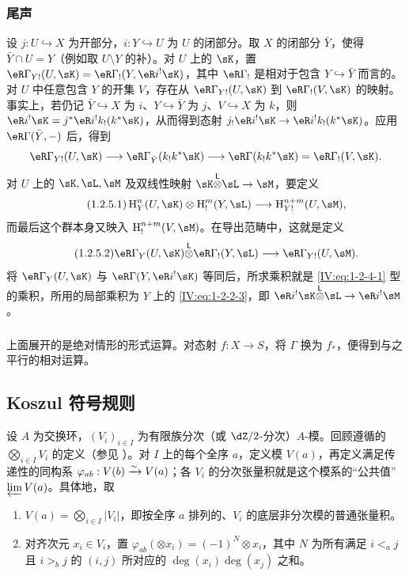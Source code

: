 \subsubsection{尾声}\label{IV:1-2-5}
设 $j:U\hookrightarrow X$ 为开部分，$i:Y\hookrightarrow U$ 为 $U$ 的闭部分。取 $X$ 的闭部分 $\bar Y$，使得 $\bar Y\cap U=Y$（例如取 $U\setminus Y$ 的补）。对 $U$ 上的 $\sK$，置 $\eR\Gamma_{Y!}(U,\sK)=\eR\Gamma_!(Y,\eR i^!\sK)$，其中 $\eR\Gamma_!$ 是相对于包含 $Y\hookrightarrow\bar Y$ 而言的。对 $U$ 中任意包含 $Y$ 的开集 $V$，存在从 $\eR\Gamma_{Y!}(U,\sK)$ 到 $\eR\Gamma_!(V,\sK)$ 的映射。事实上，若仍记 $\bar Y\hookrightarrow X$ 为 $i$、$Y\hookrightarrow\bar Y$ 为 $j$、$V\hookrightarrow X$ 为 $k$，则
$\eR i^!\sK=j^*\eR i^!k_!(k^*\sK)$，从而得到态射
$j_!\eR i^!\sK\to\eR i^!k_!(k^*\sK)$。应用 $\eR\Gamma(\bar Y,-)$ 后，得到
\[
\eR\Gamma_{Y!}(U,\sK)\longrightarrow\eR\Gamma_{\bar Y}(k_!k^*\sK)
\longrightarrow\eR\Gamma(k_!k^*\sK)=\eR\Gamma_!(V,\sK).
\]
对 $U$ 上的 $\sK,\sL,\sM$ 及双线性映射 $\sK\lotimes\sL\to\sM$，要定义
\begin{equation*}\tag{1.2.5.1}\label{IV:eq:1-2-5-1}
\h_Y^n(U,\sK)\otimes\h_!^m(Y,\sL)\longrightarrow\h_{Y!}^{n+m}(U,\sM),
\end{equation*}
而最后这个群本身又映入 $\h_!^{n+m}(V,\sM)$。在导出范畴中，这就是定义
\begin{equation*}\tag{1.2.5.2}\label{IV:eq:1-2-5-2}
\eR\Gamma_Y(U,\sK)\lotimes\eR\Gamma_!(Y,\sL)\longrightarrow\eR\Gamma_{Y!}(U,\sM).
\end{equation*}
将 $\eR\Gamma_Y(U,\sK)$ 与 $\eR\Gamma(Y,\eR i^!\sK)$ 等同后，所求乘积就是 \eqref{IV:eq:1-2-4-1} 型的乘积，所用的局部乘积为 $Y$ 上的 \eqref{IV:eq:1-2-2-3}，即 $\eR i^!\sK\lotimes\sL\to\eR i^!\sM$。

\subsubsection{}\label{IV:1-2-6}
上面展开的是绝对情形的形式运算。对态射 $f:X\to S$，将 $\Gamma$ 换为 $f_*$，便得到与之平行的相对运算。

\subsection{Koszul 符号规则}\label{IV:1-3}
设 $A$ 为交换环，$(V_i)_{i\in I}$ 为有限族分次（或 $\dZ/2$-分次）$A$-模。回顾遵循的 $\bigotimes_{i\in I}V_i$ 的定义（参见 \cite[XVII 1.1]{sga4}）。对 $I$ 上的每个全序 $a$，定义模 $V(a)$，再定义满足传递性的同构系 $\varphi_{ab}:V(b)\xrightarrow\sim V(a)$；各 $V_i$ 的分次张量积就是这个模系的“公共值” $\varprojlim V(a)$。具体地，取
\begin{enumerate}[\indent a)]
\item $V(a)=\bigotimes_{i\in I}|V_i|$，即按全序 $a$ 排列的、$V_i$ 的底层非分次模的普通张量积。
\item 对齐次元 $x_i\in V_i$，置 $\varphi_{ab}(\otimes x_i)=(-1)^N\otimes x_i$，其中 $N$ 为所有满足 $i<_aj$ 且 $i>_bj$ 的 $(i,j)$ 所对应的 $\deg(x_i)\deg(x_j)$ 之和。
\end{enumerate}

